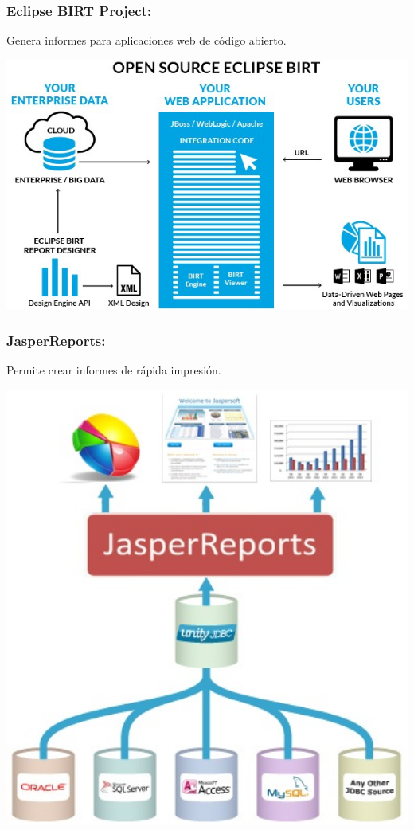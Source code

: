 \subsubsection{Eclipse BIRT Project: }\label{sec:nada2}  
Genera informes para aplicaciones web de código abierto.
	\begin{center}
	\includegraphics[width=15cm]{./Imagenes/BIimagen10}
	\end{center}
	
\subsubsection{JasperReports: }\label{sec:nada2}  
Permite crear informes de rápida impresión.
	\begin{center}
	\includegraphics[width=15cm]{./Imagenes/BIimagen11}
	\end{center}
	

